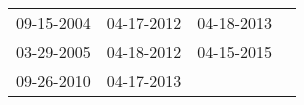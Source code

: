 \begin{supertabular}{llll}
 09-15-2004 &  04-17-2012 &  04-18-2013 \\
 03-29-2005 &  04-18-2012 &  04-15-2015 \\
 09-26-2010 &  04-17-2013 &             \\
\end{supertabular}
